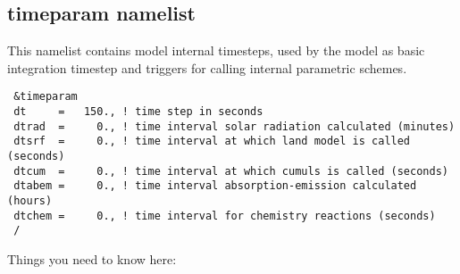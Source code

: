 \subsection{timeparam namelist}

This namelist contains model internal timesteps, used by the model as basic
integration timestep and triggers for calling internal parametric schemes.

{\footnotesize
\begin{Verbatim}
 &timeparam
 dt     =   150., ! time step in seconds
 dtrad  =     0., ! time interval solar radiation calculated (minutes)
 dtsrf  =     0., ! time interval at which land model is called (seconds)
 dtcum  =     0., ! time interval at which cumuls is called (seconds)
 dtabem =     0., ! time interval absorption-emission calculated (hours)
 dtchem =     0., ! time interval for chemistry reactions (seconds)
 /
\end{Verbatim}
}

Things you need to know here:

